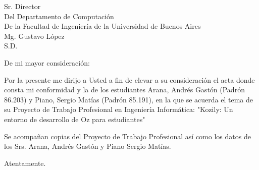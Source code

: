 \documentclass{letter}
\date{}
\begin{document}
\begin{letter}{
    Sr. Director \\
    Del Departamento de Computación \\
    De la Facultad de Ingeniería de la Universidad de Buenos Aires \\
    Mg. Gustavo López \\
    S.D.}

  \opening{De mi mayor consideración:}

  \setlength\parindent{12.25em}
  \setlength\parskip{1em}

  Por la presente me dirijo a Usted a fin de elevar a su consideración el acta
  donde consta mi conformidad y la de los estudiantes Arana, Andrés Gastón
  (Padrón 86.203) y Piano, Sergio Matías (Padrón 85.191), en la que se acuerda
  el tema de su Proyecto de Trabajo Profesional en Ingeniería Informática:
  "Kozily: Un entorno de desarrollo de Oz para estudiantes"

  Se acompañan copias del Proyecto de Trabajo Profesional así como los datos de
  los Srs. Arana, Andrés Gastón y Piano Sergio Matías.

  \closing{Atentamente.}

\end{letter}
\end{document}
